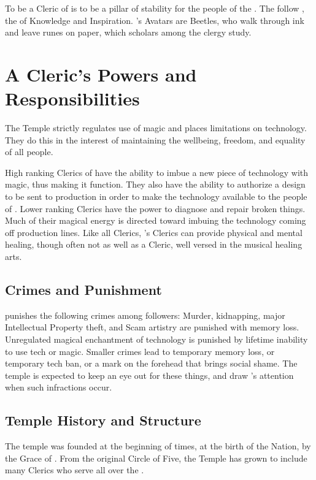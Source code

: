 \documentclass[blue]{GL2020}
\begin{document}
\name{\bFPFCleric{}}

To be a Cleric of \cTechGod{} is to be a pillar of stability for the people of the \pTech{}. The \pTech{} follow \cTechGod{}, the \cTechGod{\Deity} of Knowledge and Inspiration.  \cTechGod{}'s Avatars are Beetles, who walk through ink and leave runes on paper, which scholars among the clergy study.  

\section*{A Cleric's Powers and Responsibilities}
The Temple strictly regulates use of magic and places limitations on technology.  They do this in the interest of maintaining the wellbeing,  freedom, and equality of all people.  

High ranking Clerics of \cTechGod{} have the ability to imbue a new piece of technology with magic, thus making it function. They also have the ability to authorize a design to be sent to production in order to make the technology available to the people of \pTech{}. Lower ranking Clerics have the power to diagnose and repair broken things. Much of their magical energy is directed toward imbuing the technology coming off production lines. Like all Clerics, \cTechGod{}'s Clerics can provide physical and mental healing, though often not as well as a \pFarm{} Cleric, well versed in the musical healing arts.

\subsection*{Crimes and Punishment}
\cTechGod{} punishes the following crimes among \cTechGod{\their} followers:  Murder, kidnapping, major Intellectual Property theft, and Scam artistry are punished with memory loss.  Unregulated magical enchantment of technology is punished by lifetime inability to use tech or magic.  Smaller crimes lead to temporary memory loss, or temporary tech ban, or a mark on the forehead that brings social shame. The temple is expected to keep an eye out for these things, and draw \cTechGod{}'s attention when such infractions occur.

\subsection*{Temple History and Structure}
The temple was founded at the beginning of times, at the birth of the Nation, by the Grace of \cTechGod{}. From the original Circle of Five, the Temple has grown to include many Clerics who serve all over the \pTech{}.
\end{document}
